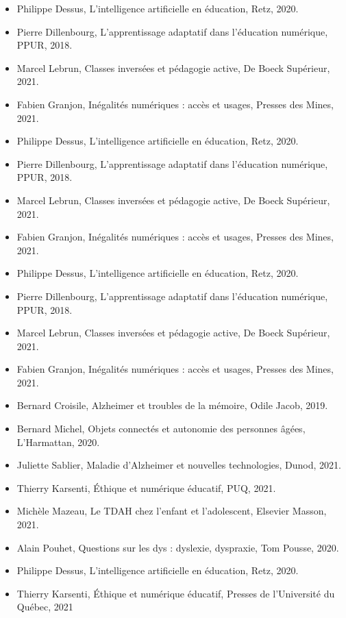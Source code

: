 \documentclass[12pt,a4paper]{report}
\begin{document}
\begin{itemize}
    \item Philippe Dessus, L’intelligence artificielle en éducation, Retz, 2020.
    \item Pierre Dillenbourg, L’apprentissage adaptatif dans l’éducation numérique, PPUR, 2018.
    \item Marcel Lebrun, Classes inversées et pédagogie active, De Boeck Supérieur, 2021.
    \item Fabien Granjon, Inégalités numériques : accès et usages, Presses des Mines, 2021.

    \item Philippe Dessus, L’intelligence artificielle en éducation, Retz, 2020.
    \item Pierre Dillenbourg, L’apprentissage adaptatif dans l’éducation numérique, PPUR, 2018.
    \item Marcel Lebrun, Classes inversées et pédagogie active, De Boeck Supérieur, 2021.
    \item Fabien Granjon, Inégalités numériques : accès et usages, Presses des Mines, 2021.
    
    \item Philippe Dessus, L’intelligence artificielle en éducation, Retz, 2020.
    \item Pierre Dillenbourg, L’apprentissage adaptatif dans l’éducation numérique, PPUR, 2018.
    \item Marcel Lebrun, Classes inversées et pédagogie active, De Boeck Supérieur, 2021.
    \item Fabien Granjon, Inégalités numériques : accès et usages, Presses des Mines, 2021.
    
    \item Bernard Croisile, Alzheimer et troubles de la mémoire, Odile Jacob, 2019.
    \item Bernard Michel, Objets connectés et autonomie des personnes âgées, L'Harmattan, 2020.
    \item Juliette Sablier, Maladie d’Alzheimer et nouvelles technologies, Dunod, 2021.
    \item Thierry Karsenti, Éthique et numérique éducatif, PUQ, 2021.
    
    \item Michèle Mazeau, Le TDAH chez l'enfant et l'adolescent, Elsevier Masson, 2021.
    \item Alain Pouhet, Questions sur les dys : dyslexie, dyspraxie, Tom Pousse, 2020.
    \item Philippe Dessus, L’intelligence artificielle en éducation, Retz, 2020.
    \item Thierry Karsenti, Éthique et numérique éducatif, Presses de l’Université du Québec, 2021
    

\end{itemize}
\end{document}
